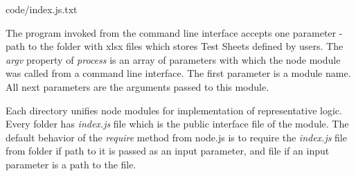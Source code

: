 
{code/index.js.txt}

The program invoked from the command line interface accepts one parameter - path to the folder with xlsx files which stores Test Sheets defined by users. The \textit{argv} property of \textit{process} is an array of parameters with which the node module was called from a command line interface. The first parameter is a module name. All next parameters are the arguments passed to this module.

Each directory unifies node modules for implementation of representative logic. Every folder has \textit{index.js} file which is the public interface file of the module. The default behavior of the \textit{require} method from node.js is to require the \textit{index.js} file from folder if path to it is passed as an input parameter, and file if an input parameter is a path to the file.

